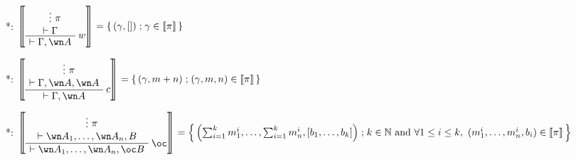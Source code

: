 *: \(\sem{
\AxRule{}
\VdotsRule{ \pi }{ \vdash \Gamma }
\LabelRule{ w }
\UnaRule{ \vdash \Gamma, \wn A }
\DisplayProof} =  \set{(\gamma,[])}{\gamma\in\sem\pi}\)

*: \(\sem{
\AxRule{}
\VdotsRule{ \pi }{ \vdash \Gamma, \wn A, \wn A }
\LabelRule{ c }
\UnaRule{ \vdash \Gamma, \wn A }
\DisplayProof} =  \set{(\gamma,m+n)}{(\gamma,m,n)\in\sem\pi}\)

*: \(\sem{
\AxRule{}
\VdotsRule{ \pi }{ \vdash \wn A_1,\ldots,\wn A_n,B }
\LabelRule{ \oc }
\UnaRule{ \vdash \wn A_1,\ldots,\wn A_n,\oc B }
\DisplayProof} = \set{
\left(\sum_{i=1}^k m_1^i,\ldots,\sum_{i=1}^k m_n^i,[b_1,\ldots,b_k]\right)}
{k \in \mathbb{N} \ \text{and} \ \forall 1 \leq i \leq k,\ (m_1^i,\ldots,m_n^i,b_i)\in\sem\pi}\)


